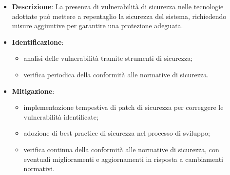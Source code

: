 \label{risk:problemi di sicurezza delle tecnologie utilizzate}
\begin{itemize}
	\item \textbf{Descrizione}: La presenza di vulnerabilità di sicurezza nelle tecnologie 
								adottate può mettere a repentaglio la sicurezza del sistema, 
								richiedendo misure aggiuntive per garantire una protezione adeguata.
	\item \textbf{Identificazione}:
	      \begin{itemize}
		      \item analisi delle vulnerabilità tramite strumenti di sicurezza;
		      
			  \item verifica periodica della conformità alle normative di sicurezza.
	      \end{itemize}

	\item \textbf{Mitigazione}:
	      \begin{itemize}
		      \item implementazione tempestiva di patch di sicurezza per correggere le vulnerabilità identificate;

		      \item adozione di best practice di sicurezza nel processo di sviluppo;
		      
			  \item verifica continua della conformità alle normative di sicurezza, con 
			  		eventuali miglioramenti e aggiornamenti in risposta a cambiamenti normativi.
	      \end{itemize}
\end{itemize}
